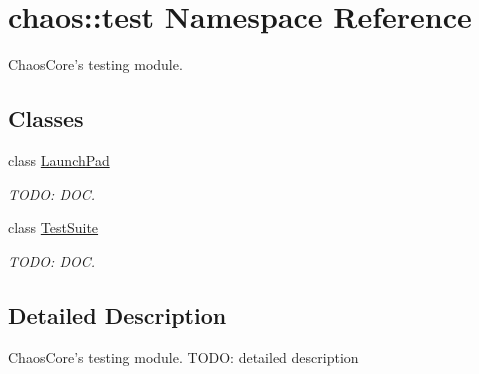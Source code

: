 \hypertarget{namespacechaos_1_1test}{\section{chaos\-:\-:test Namespace Reference}
\label{namespacechaos_1_1test}
}


Chaos\-Core's testing module.  


\subsection*{Classes}
\begin{DoxyCompactItemize}
\item 
class \hyperlink{classchaos_1_1test_1_1_launch_pad}{Launch\-Pad}
\begin{DoxyCompactList}\small\item\em T\-O\-D\-O\-: D\-O\-C. \end{DoxyCompactList}\item 
class \hyperlink{classchaos_1_1test_1_1_test_suite}{Test\-Suite}
\begin{DoxyCompactList}\small\item\em T\-O\-D\-O\-: D\-O\-C. \end{DoxyCompactList}\end{DoxyCompactItemize}


\subsection{Detailed Description}
Chaos\-Core's testing module. T\-O\-D\-O\-: detailed description 